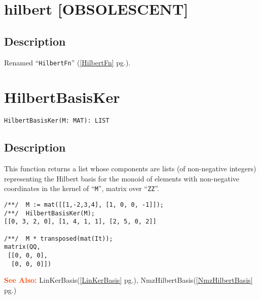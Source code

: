 \documentclass[a4paper]{mybook}
\newenvironment{command}{}{} %
\newcommand\SeeAlso{\par\textcolor{OrangeRed}{\textbf{\large See Also: }}}
\begin{document}
\section{hilbert [OBSOLESCENT]}
\label{hilbert [OBSOLESCENT]}
\begin{command} %



\subsection*{Description}

Renamed ``\verb&HilbertFn&'' (\ref{HilbertFn} pg.\pageref{HilbertFn}).

\end{command} %

\section{HilbertBasisKer}
\label{HilbertBasisKer}
\begin{command} %


\begin{Verbatim}[label=syntax, rulecolor=\color{MidnightBlue},
frame=single]
HilbertBasisKer(M: MAT): LIST
\end{Verbatim}


\subsection*{Description}

This function returns a list whose components are lists (of
non-negative integers) representing the Hilbert basis for the monoid
of elements with non-negative coordinates in the kernel of ``\verb&M&'',
matrix over ``\verb&ZZ&''.
\begin{Verbatim}[label=example, rulecolor=\color{PineGreen}, frame=single]
/**/  M := mat([[1,-2,3,4], [1, 0, 0, -1]]);
/**/  HilbertBasisKer(M);
[[0, 3, 2, 0], [1, 4, 1, 1], [2, 5, 0, 2]]

/**/  M * transposed(mat(It));
matrix(QQ,
 [[0, 0, 0],
  [0, 0, 0]])
\end{Verbatim}


\SeeAlso %
  LinKerBasis(\ref{LinKerBasis} pg.\pageref{LinKerBasis}), 
    NmzHilbertBasis(\ref{NmzHilbertBasis} pg.\pageref{NmzHilbertBasis})
\end{command} %
\end{document}
